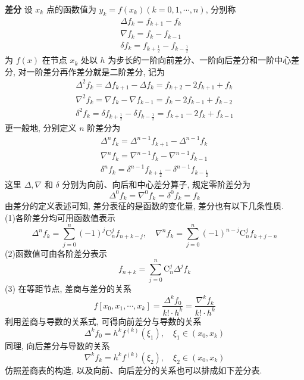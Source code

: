 \textbf{差分} \; 设 $ x_{k} $ 点的函数值为 $ y_{k}=f\left(x_{k}\right)(k=0,1, \cdots, n) $, 分别称
$$
\begin{array}{c}
\Delta f_{k}=f_{k+1}-f_{k} \\
\nabla f_{k}=f_{k}-f_{k-1} \\
\delta f_{k}=f_{k+\frac{1}{2}}-f_{k-\frac{1}{2}}
\end{array}
$$
为 $ f(x) $ 在节点 $ x_{k} $ 处以 $ h $ 为步长的一阶向前差分、一阶向后差分和一阶中心差分, 对一阶差分再作差分就是二阶差分, 记为
$$
\begin{array}{c}
\Delta^{2} f_{k}=\Delta f_{k+1}-\Delta f_{k}=f_{k+2}-2 f_{k+1}+f_{k} \\
\nabla^{2} f_{k}=\nabla f_{k}-\nabla f_{k-1}=f_{k}-2 f_{k-1}+f_{k-2} \\
\delta^{2} f_{k}=\delta f_{k+\frac{1}{2}}-\delta f_{k-\frac{1}{2}}=f_{k+1}-2 f_{k}+f_{k-1}
\end{array}
$$
更一般地, 分别定义 $ n $ 阶差分为
$$
\begin{array}{c}
\Delta^{n} f_{k}=\Delta^{n-1} f_{k+1}-\Delta^{n-1} f_{k} \\
\nabla^{n} f_{k}=\nabla^{n-1} f_{k}-\nabla^{n-1} f_{k-1} \\
\delta^{n} f_{k}=\delta^{n-1} f_{k+\frac{1}{2}}-\delta^{n-1} f_{k-\frac{1}{2}}
\end{array}
$$
这里 $ \Delta, \nabla $ 和 $ \delta $ 分别为向前、向后和中心差分算子, 规定零阶差分为
$$
\Delta^{0} f_{k}=\nabla^{0} f_{k}=\delta^{0} f_{k}=f_{k}
$$
由差分的定义表述可知, 差分表征的是函数的变化量, 差分也有以下几条性质.\\
(1)各阶差分均可用函数值表示
$$
\Delta^{n} f_{k}=\sum_{j=0}^{n}(-1)^{j} \mathrm{C}_{n}^{j} f_{n+k-j}, \quad \nabla^{n} f_{k}=\sum_{j=0}^{n}(-1)^{n-j} \mathrm{C}_{n}^{j} f_{k+j-n}
$$
(2)函数值可由各阶差分表示
$$
f_{n+k}=\sum_{j=0}^{n} \mathrm{C}_{n}^{j} \Delta^{j} f_{k}
$$
(3) 在等距节点, 差商与差分的关系
$$
f\left[x_{0}, x_{1}, \cdots, x_{k}\right]=\frac{\Delta^{k} f_{0}}{k!\cdot h^{k}}=\frac{\nabla^{k} f_{k}}{k!\cdot h^{k}}
$$
利用差商与导数的关系式, 可得向前差分与导数的关系
$$
\Delta^{k} f_{0}=h^{k} f^{(k)}\left(\xi_{1}\right), \quad \xi_{1} \in\left(x_{0}, x_{k}\right)
$$
同理, 向后差分与导数的关系
$$
\nabla^{k} f_{k}=h^{k} f^{(k)}\left(\xi_{2}\right), \quad \xi_{2} \in\left(x_{0}, x_{k}\right)
$$
仿照差商表的构造, 以及向前、向后差分的关系也可以排成如下差分表.

